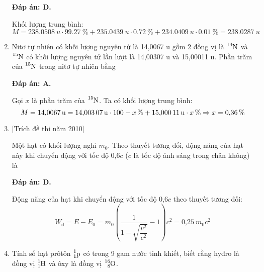 \begin{enumerate}[label=\bfseries Câu \arabic*:]
	\loigiai
	{		\textbf{Đáp án: D.}
		
		Khối lượng trung bình:
		$$M=\SI{238.0508}{u} \cdot \SI{99.27}{\percent} + \SI{235.0439}{u} \cdot \SI{0.72}{\percent} + \SI{234.0409}{u} \cdot \SI{0.01}{\percent} = \SI{238.0287}{u}$$
		
	}
	\item {}
	
	\cauhoi
	{Nitơ tự nhiên có khối lượng nguyên tử là 14,0067 u gồm 2 đồng vị là $\ce{^{14} N}$ và $\ce{^{15} N}$ có khối lượng nguyên tử lần lượt là 14,00307 u và 15,00011 u. Phần trăm của $\ce{^{15} N}$ trong nitơ tự nhiên bằng
	}
	
	\loigiai
	{		\textbf{Đáp án: A.}
		
		Gọi $x$ là phần trăm của $\ce{^15 N}$. Ta có khối lượng trung bình:
		$$M=\SI{14.0067}{u}=\SI{14.00307}{u} \cdot \xsi{100-x}{\percent} + \SI{15.00011}{u} \cdot \xsi{x}{\percent} \Rightarrow x= \SI{0.36}{\percent}$$
		
	}
	\item {} [Trích đề thi năm 2010]
	
	\cauhoi
	{Một hạt có khối lượng nghỉ $m_0$. Theo thuyết tương đối, động năng của hạt này khi chuyển động với tốc độ $\text{0,6}c$ ($c$ là tốc độ ánh sáng trong chân không) là
	}
	
	\loigiai
	{		\textbf{Đáp án: D.}
		
		Động năng của hạt khi chuyển động với tốc độ $\text{0,6}c$ theo thuyết tương đối:
		$$W_\text{đ} =E-E_0=  m_0 \left(\dfrac{1}{1-\sqrt{\dfrac{v^2}{c^2}}}-1\right)c^2=\text{0,25}\ m_0c^2$$
		
	}
	\item {}
	
	\cauhoi
	{Tính số hạt prôtôn $\ce{^1_1 p}$ có trong 9 gam nước tinh khiết, biết rằng hyđro là đồng vị $\ce{^1_1 H}$ và ôxy là đồng vị $\ce{^{16}_8 O}$.
	}
	

\end{enumerate}
